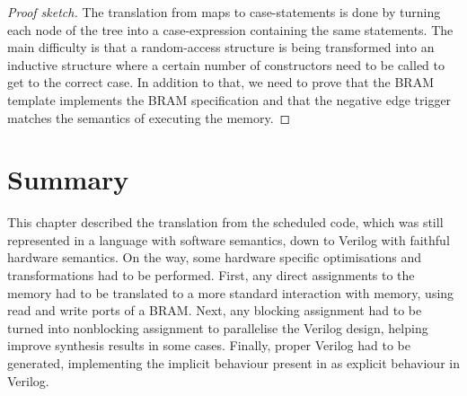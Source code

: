 \begin{proof}[Proof sketch]
  The translation from maps to case-statements is done by turning each node of
  the tree into a case-expression containing the same statements.  The main
  difficulty is that a random-access structure is being transformed into an
  inductive structure where a certain number of constructors need to be called
  to get to the correct case.  In addition to that, we need to prove that the
  \gls{BRAM} template implements the \gls{BRAM} specification and that the
  negative edge trigger matches the \htl{} semantics of executing the memory.
\end{proof}

\section{Summary}

This chapter described the translation from the scheduled code, which was still
represented in a language with software semantics, down to Verilog with faithful
hardware semantics.  On the way, some hardware specific optimisations and
transformations had to be performed.  First, any direct assignments to the
memory had to be translated to a more standard interaction with memory, using
read and write ports of a \gls{BRAM}.  Next, any blocking assignment had to be
turned into nonblocking assignment to parallelise the Verilog design, helping
improve synthesis results in some cases.  Finally, proper Verilog had to be
generated, implementing the implicit behaviour present in \htl{} as explicit
behaviour in Verilog.



